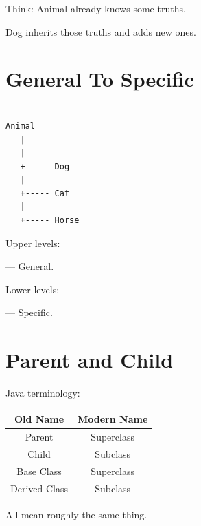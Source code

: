 \documentclass[11pt,a4paper]{book}
\begin{document}

Think: Animal already knows some truths.


Dog \textcolor{RosettaOrange}{inherits} those truths and adds \textcolor{RosettaOrange}{new} ones.

\newpage
\section{General To Specific}

\begin{verbatim}

Animal
   |
   |
   +----- Dog
   |
   +----- Cat
   |
   +----- Horse

\end{verbatim}


Upper levels:

    --- General.


Lower levels:

    --- Specific.


\section{Parent and Child}

Java terminology:


\begin{tabular}{|c|c|}
\hline
\textbf{Old Name} & \textbf{Modern Name} \\
\hline
Parent & Superclass \\
\hline
Child & Subclass \\
\hline
Base Class & Superclass \\
\hline
Derived Class & Subclass \\
\hline
\end{tabular}


All mean roughly the same thing.
\end{document}
